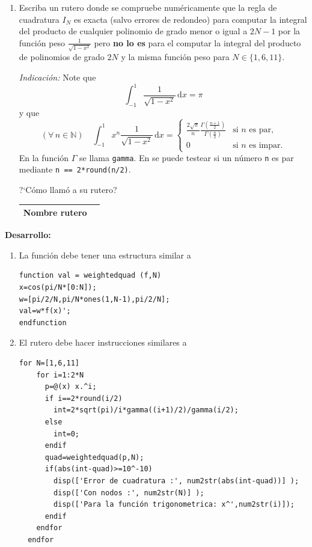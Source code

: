 \documentclass[legalpaper,11pt]{article}
\begin{document}
\begin{enumerate}
\begin{enumerate}
\medskip

\item {} Escriba un rutero \matlab donde se compruebe num\'ericamente que la regla de cuadratura $I_N$ es exacta (salvo errores de redondeo) para computar la integral del producto de cualquier polinomio de grado menor o igual a $2N-1$ por la funci\'on peso $\frac{1}{\sqrt{1-x^2}}$ pero \textbf{no lo es} para el computar la integral del producto de polinomios de grado $2N$ y la misma funci\'on peso para $N \in \{1, 6, 11\}$.

\emph{Indicaci\'on:} Note que
%
\begin{equation*}
\int_{-1}^1 \frac{1}{\sqrt{1-x^2}} \, \mathrm{d}x = \pi
\end{equation*}
%
y que
%
\begin{equation*}
(\forall\,n\in\mathbb{N}) \quad
\int_{-1}^1 x^n \frac{1}{\sqrt{1-x^2}} \, \mathrm{d}x
= \begin{cases}
\frac{2\sqrt{\pi}}{n} \frac{\Gamma\left(\frac{n+1}{2}\right)}{\Gamma\left(\frac{n}{2}\right)} & \text{si $n$ es par,}\\
0 & \text{si $n$ es impar.}
\end{cases}
\end{equation*}
%
En \matlab la funci\'on $\Gamma$ se llama \texttt{gamma}.
En \matlab se puede testear si un n\'umero \texttt{n} es par mediante \texttt{n == 2*round(n/2)}.

\medskip

?`C\'omo llam\'o a su rutero?

\begin{tabularx}{\linewidth}{|p{7em}|X|}\hline
Nombre rutero & \\\hline
\end{tabularx}

\medskip

\end{enumerate}
\textbf{Desarrollo:} 
\begin{enumerate}
\item 
La funci\'on debe tener una estructura similar a
\begin{lstlisting}
function val = weightedquad (f,N)
x=cos(pi/N*[0:N]);
w=[pi/2/N,pi/N*ones(1,N-1),pi/2/N];
val=w*f(x)';
endfunction
\end{lstlisting}
\hfill{}

\item El rutero debe hacer instrucciones similares a
\begin{lstlisting}
for N=[1,6,11]
    for i=1:2*N
      p=@(x) x.^i;
      if i==2*round(i/2)
        int=2*sqrt(pi)/i*gamma((i+1)/2)/gamma(i/2);
      else
        int=0;
      endif
      quad=weightedquad(p,N);
      if(abs(int-quad)>=10^-10)
        disp(['Error de cuadratura :', num2str(abs(int-quad))] );
        disp(['Con nodos :', num2str(N)] );
        disp(['Para la función trigonometrica: x^',num2str(i)]);
      endif
    endfor
  endfor
\end{lstlisting}
\hfill{}


\end{enumerate}
\end{enumerate}
\end{document}
